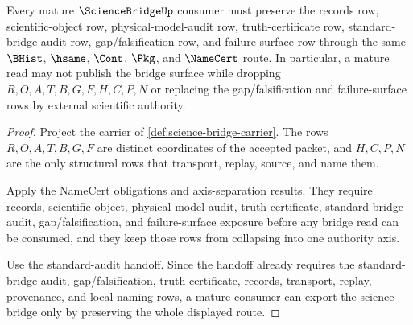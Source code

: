 \begin{theorem}
\label{thm:science-bridge-mature-failure-surface-export}
Every mature $\ScienceBridgeUp$ consumer must preserve the records row, scientific-object row, physical-model-audit row, truth-certificate row, standard-bridge-audit row, gap/falsification row, and failure-surface row through the same $\BHist$, $\hsame$, $\Cont$, $\Pkg$, and $\NameCert$ route. In particular, a mature read may not publish the bridge surface while dropping $R,O,A,T,B,G,F,H,C,P,N$ or replacing the gap/falsification and failure-surface rows by external scientific authority.
\end{theorem}
\begin{proof}
Project the carrier of \autoref{def:science-bridge-carrier}. The rows $R,O,A,T,B,G,F$ are distinct coordinates of the accepted packet, and $H,C,P,N$ are the only structural rows that transport, replay, source, and name them.

Apply the NameCert obligations and axis-separation results. They require records, scientific-object, physical-model audit, truth certificate, standard-bridge audit, gap/falsification, and failure-surface exposure before any bridge read can be consumed, and they keep those rows from collapsing into one authority axis.

Use the standard-audit handoff. Since the handoff already requires the standard-bridge audit, gap/falsification, truth-certificate, records, transport, replay, provenance, and local naming rows, a mature consumer can export the science bridge only by preserving the whole displayed route.
\end{proof}


\begin{closurestatus}{\ScienceBridgeUp}
  \theoryclosure{\matureClosure}
  \formalstatus{\unformalizedV}
\end{closurestatus}
